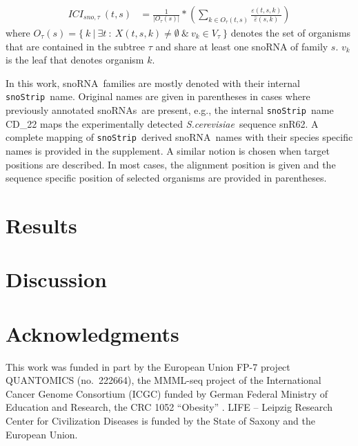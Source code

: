 \documentclass[preprint,3p,times,twocolumn]{elsarticle}
\newcommand{\snos}{snoRNAs}
\newcommand{\sno}{snoRNA}
\newcommand{\snostrip}{\texttt{snoStrip}}
\newcommand{\sce}{\emph{S.cerevisiae}}
\begin{document}
\begin{equation}
  \begin{split}
    ICI_{sno,\tau}\:(t,s) & = \frac{1}{|O_\tau(s)|} * \left( \sum_{k\in O_\tau(t,s)} \frac{\varepsilon(t,s,k)}{\hat\varepsilon(s,k)} \right)
  \end{split}
\end{equation}
where $O_\tau(s) = \{\  k\  |\  \exists t\  :\  X(t,s,k) \ne \emptyset\ \&\ 
v_k \in V_\tau\ \}$ denotes the set of organisms that are contained in the
subtree $\tau$ and share at least one snoRNA of family $s$. $v_k$ is the leaf
that denotes organism $k$.

\vspace{5mm}
\par
In this work, \sno\ families are mostly denoted with their 
internal \snostrip\ name. Original names are given in parentheses in cases where previously annotated \snos\
are present, e.g., the internal \snostrip\ name
CD\_22 maps the experimentally detected \sce\ sequence snR62. A
complete mapping of \snostrip\ derived \sno\ names with their
species specific names is provided in the supplement. 
A similar notion is chosen when target positions are described. In most
cases, the alignment position is given and the sequence specific
position of selected organisms are provided in parentheses. 


\section{Results}


\section{Discussion}



\section*{Acknowledgments}

This work was funded in part by the European Union FP-7 project QUANTOMICS
(no.\ 222664), the MMML-seq project of the International Cancer Genome
Consortium (ICGC) funded by German Federal Ministry of Education and
Research, the CRC 1052 ``Obesity'' \TODO{ and ...}. LIFE -- Leipzig
Research Center for Civilization Diseases is funded by the State of Saxony
and the European Union.
\end{document}
